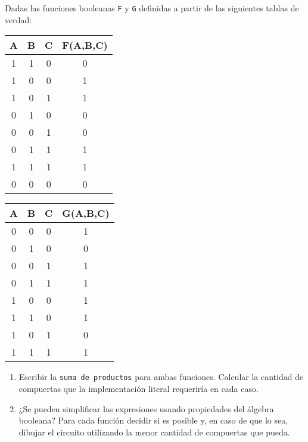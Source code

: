 \begin{enunciado}{\ejercicio}

  Dadas las funciones booleanas \texttt{F} y \texttt{G}
  definidas a partir de las siguientes tablas de verdad:\par

  \begin{center}
    {        \ttfamily
      \begin{tabular}{|c|c|c|c|}
        \hline
        A & B & C & F(A,B,C) \\ \hline
        1 & 1 & 0 & 0        \\ \hline
        1 & 0 & 0 & 1        \\ \hline
        1 & 0 & 1 & 1        \\ \hline
        0 & 1 & 0 & 0        \\ \hline
        0 & 0 & 1 & 0        \\ \hline
        0 & 1 & 1 & 1        \\ \hline
        1 & 1 & 1 & 1        \\ \hline
        0 & 0 & 0 & 0        \\ \hline
      \end{tabular}
    }
    {        \ttfamily
      \begin{tabular}{|c|c|c|c|}
        \hline
        A & B & C & G(A,B,C) \\ \hline
        0 & 0 & 0 & 1        \\ \hline
        0 & 1 & 0 & 0        \\ \hline
        0 & 0 & 1 & 1        \\ \hline
        0 & 1 & 1 & 1        \\ \hline
        1 & 0 & 0 & 1        \\ \hline
        1 & 1 & 0 & 1        \\ \hline
        1 & 0 & 1 & 0        \\ \hline
        1 & 1 & 1 & 1        \\ \hline
      \end{tabular}
    }
  \end{center}

  \begin{enumerate}[label=\alph*)]
    \item Escribir la \texttt{suma de productos} para ambas funciones. Calcular la cantidad
          de compuertas que la implementación literal requeriría en cada caso.

    \item ¿Se pueden simplificar las expresiones usando propiedades del álgebra booleana?
          Para cada función decidir si es posible y, en caso de que lo sea, dibujar el circuito utilizando
          la menor cantidad de compuertas que pueda.
  \end{enumerate}

\end{enunciado}

